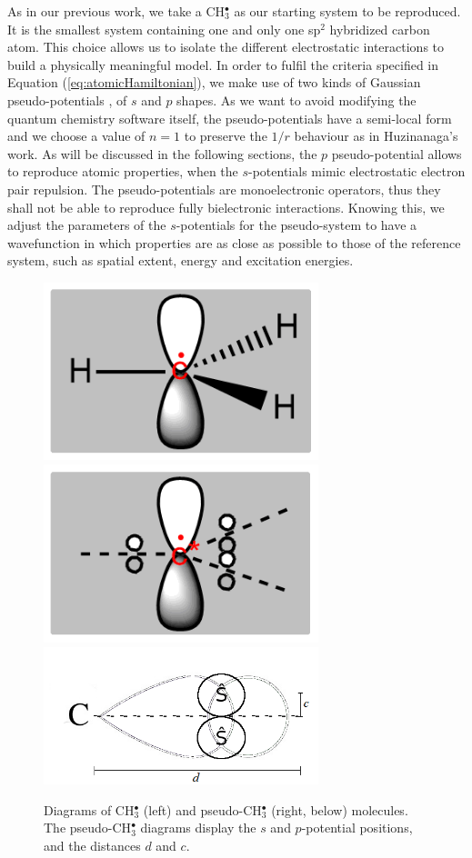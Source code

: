 \documentclass[journal=jctcce,manuscript=article]{achemso}
\begin{document}
As in our previous work\cite{drujon_pseudopotentials_2013},
we take a CH\(^{\bullet}_{3}\) as our starting system to be reproduced.
It is the smallest system containing one and only one sp$^2$ hybridized carbon atom.
This choice allows us to isolate the different electrostatic interactions
to build a physically meaningful model.
In order to fulfil the criteria specified in Equation (\ref{eq:atomicHamiltonian}),
we make use of two kinds of Gaussian pseudo-potentials \cite{me_structure_theory}, of \(s\) and \(p\) shapes. As we want to avoid modifying the quantum chemistry software itself, the pseudo-potentials have a semi-local form and we choose a value of \(n = 1\) to preserve the \(1/r\) behaviour as in Huzinanaga's work. As will be discussed in the following sections,
the \(p\) pseudo-potential allows to reproduce atomic properties, when the
\(s\)-potentials mimic electrostatic electron pair repulsion. The pseudo-potentials are monoelectronic operators, thus they shall not be able to reproduce fully bielectronic interactions. Knowing this, we adjust the parameters of the \(s\)-potentials for the pseudo-system to have a wavefunction in which properties are as close as possible to those of the reference system, such as spatial extent, energy and excitation energies.

\begin{figure}[ht]
\includegraphics[width=8cm]{ch3.png}
\includegraphics[width=8cm]{pseudoch3.png}
\includegraphics[width=8cm]{tm_sp2_potentials.png}
\caption{Diagrams of CH\(^{\bullet}_{3}\) (left) and pseudo-CH\(^{\bullet}_{3}\) (right, below) molecules. The pseudo-CH\(^{\bullet}_{3}\) diagrams display the \(s\) and \(p\)-potential positions, and the distances \(d\) and \(c\).}
\label{figure:ref_pseudo_diagram}
\end{figure}
\end{document}
